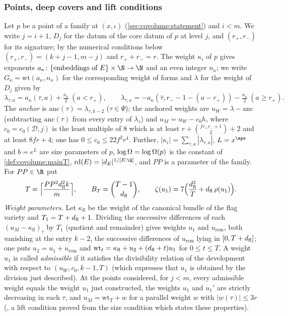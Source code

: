 \subsubsection*{Points, deep covers and lift conditions}
Let $p$ be a point of a family at $(x,\iota)$ (\cref{sec:covolume:statement}) and $i<m$. We write $j=i+1$,
$D_j$ for the datum of the core datum of $p$ at level $j$, and $(r_+,r_-)$ for its signature; by the
numerical conditions below $(r_+,r_-)=(k+j-1,m-j)$ and $r_++r_-=r$. The weight $\kappa_i$ of $p$ gives
exponents $a_\kappa\colon\{\text{embeddings of }E\}\times\N\to\N$ and an even integer $n_\kappa$; we write
$G_\kappa=\mathrm{wt}(a_\kappa,n_\kappa)$ for the corresponding weight of forms and $\lambda$ for the
weight of $D_j$ given by
\[
\lambda_{\tau,a}=a_\kappa(\tau,a)+\tfrac{n_\kappa}2\ (a<r_+),\qquad
\lambda_{\tau,a}=-a_\kappa(\bar\tau,r_--1-(a-r_+))-\tfrac{n_\kappa}2\ (a\ge r_+).
\]
The \emph{anchor} is $\mathrm{anc}(\tau)=\lambda_{\tau,k-2}$ ($\tau\in\Psi$); the anchored weights are
$u_W=\lambda-\mathrm{anc}$ (subtracting $\mathrm{anc}(\tau)$ from every entry of $\lambda_\tau$) and
$u_M=u_W-c_0h$, where $c_0=c_0(\mathcal D,j)$ is the least multiple of $8$ which is at least
$r+\binom{fr_+r_-+1}2+2$ and at least $8fr+4$; one has $0\le c_0\le22f^2r^4$. Further, $|\kappa_i|=\sum_{\tau,a}|\lambda_{\tau,a}|$, $L=x^\eps$ and $b=e^L$ are
size parameters of $p$, $\log\Omega=\log\Omega(p)$ is the constant of
\cref{def:covolume:mainT}, $\liftonerd(E)=|d_E|^{1/[E:\Q]}$, and $PP$ is a parameter of the family.
For $PP\in\R$ put
\[
T=\Bigl\lceil\frac{PP^2d_{\mathrm{fl}}^2k}{m}\Bigr\rceil,\qquad
B_T=\binom{T-1}{d_{\mathrm{fl}}},\qquad
\zeta(u_1)=7\Bigl(\frac{d_{\mathrm{fl}}^2}{T}+d_{\mathrm{fl}}\,\rho(u_1)\Bigr).
\]
\emph{Weight parameters.} Let $\kappa_{\mathrm{fl}}$ be the weight of the canonical bundle of the flag
variety and $T_1=T+d_{\mathrm{fl}}+1$. Dividing the successive differences of each
$(u_M-\kappa_{\mathrm{fl}})_\tau$ by $T_1$ (quotient and remainder) gives weights $u_1$ and
$u_{\mathrm{rem}}$, both vanishing at the entry $k-2$, the successive differences of $u_{\mathrm{rem}}$
lying in $[0,T+d_{\mathrm{fl}}]$; one puts $u_2=u_1+u_{\mathrm{rem}}$ and
$\mathrm{wt}_t=\kappa_{\mathrm{fl}}+u_2+(d_{\mathrm{fl}}+t)u_1$ for $0\le t\le T$. A weight $u_1$ is called
\emph{admissible} if it satisfies the divisibility relation of the development with respect to
$(u_W,c_0,k-1,T)$ (which expresses that $u_1$ is obtained by the division just described). At the
points considered, for $j<m$, every admissible weight equals the weight $u_1$ just constructed, the
weights $u_1$ and $u_1'$ are strictly decreasing in each $\tau$, and $u_M=\mathrm{wt}_T+w$ for a parallel
weight $w$ with $|w(\tau)|\le3r$ (, a lift
condition proved from the size condition which states these properties).

